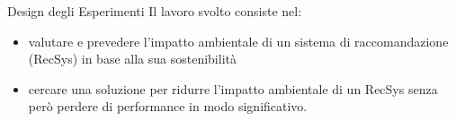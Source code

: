 \begin{frame}{Design degli Esperimenti}
    Il lavoro svolto consiste nel:
    \begin{itemize}
    \item valutare e prevedere l’impatto ambientale di un sistema di raccomandazione (RecSys) in base alla sua
    sostenibilità
    \item cercare una soluzione per ridurre l’impatto ambientale di un RecSys senza però perdere di performance in
    modo significativo.
    \end{itemize}
\end{frame}